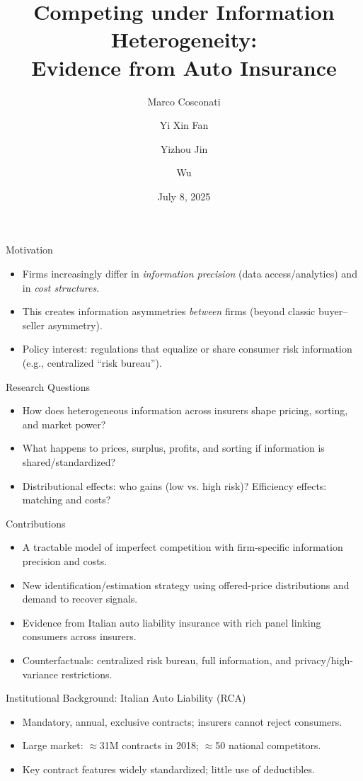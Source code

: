 \documentclass[10pt,aspectratio=169]{beamer}
\title[Competing under Information Heterogeneity]{Competing under Information Heterogeneity:\\ Evidence from Auto Insurance}
\author[Cosconati, Fan, Jin, Wu]{Marco Cosconati \and Yi Xin Fan \and Yizhou Jin \and Wu}
\institute{IVASS, Bank of Italy \and Caltech \and Caltech \and University of Toronto}
\date{July 8, 2025}
\begin{document}
\begin{frame}
  \titlepage
\end{frame}

\begin{frame}{Motivation}
\justifying
\begin{itemize}
  \item Firms increasingly differ in \emph{information precision} (data access/analytics) and in \emph{cost structures}.
  \item This creates information asymmetries \emph{between} firms (beyond classic buyer--seller asymmetry).
  \item Policy interest: regulations that equalize or share consumer risk information (e.g., centralized ``risk bureau'').
\end{itemize}
\end{frame}

\begin{frame}{Research Questions}
\justifying
\begin{itemize}
  \item How does heterogeneous information across insurers shape pricing, sorting, and market power?
  \item What happens to prices, surplus, profits, and sorting if information is shared/standardized?
  \item Distributional effects: who gains (low vs. high risk)? Efficiency effects: matching and costs?
\end{itemize}
\end{frame}

\begin{frame}{Contributions}
\justifying
\begin{itemize}
  \item A tractable model of imperfect competition with firm-specific information precision and costs.
  \item New identification/estimation strategy using offered-price distributions and demand to recover signals.
  \item Evidence from Italian auto liability insurance with rich panel linking consumers across insurers.
  \item Counterfactuals: centralized risk bureau, full information, and privacy/high-variance restrictions.
\end{itemize}
\end{frame}

\begin{frame}{Institutional Background: Italian Auto Liability (RCA)}
\justifying
\begin{itemize}
  \item Mandatory, annual, exclusive contracts; insurers cannot reject consumers.
  \item Large market: $\approx$31M contracts in 2018; $\approx$50 national competitors.
  \item Key contract features widely standardized; little use of deductibles.
\end{itemize}
\end{frame}
\end{document}
